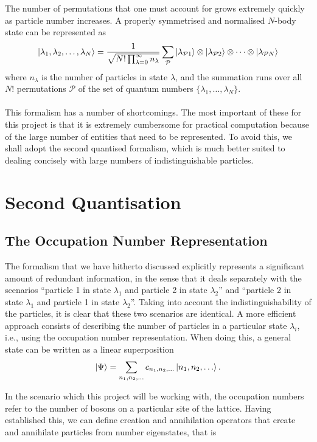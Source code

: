 \documentclass[a4paper,10pt]{article}
\begin{document}
The number of permutations that one must account for grows extremely quickly as particle number increases. A properly symmetrised and normalised $N$-body state can be
represented as \cite{Altland2010}
\begin{equation}
 \ket{\lambda_1,\lambda_2,\dots,\lambda_N}=\frac{1}{\sqrt{N!\prod_{\lambda=0}^{\infty}{n_{\lambda}}}}
 \sum_{\mathcal{P}}\ket{\lambda_{\mathcal{P}1}}\otimes \ket{\lambda_{\mathcal{P}2}}\otimes\dots\otimes\ket{\lambda_{\mathcal{P}N}}
\end{equation}
where $n_{\lambda}$ is the number of particles in state $\lambda$, and the summation runs over all $N!$ permutations $\mathcal{P}$ of the set of quantum numbers $\{ \lambda_1,\dots,\lambda_N\}$.
\\\\
This formalism has a number of shortcomings. The most important of these for this project is that it is extremely cumbersome for practical computation because of the large number of entities that need to be 
represented. To avoid this, we shall adopt the second quantised formalism, which is much better suited to dealing concisely with large numbers of indistinguishable particles.
\newpage
\section{Second Quantisation}
\subsection{The Occupation Number Representation}
The formalism that we have hitherto discussed explicitly represents a significant amount of redundant information, in the sense that it deals separately with the scenarios ``particle 1 in state $\lambda_1$ and 
particle 2 in state $\lambda_2$'' and ``particle 2 in state $\lambda_1$ and particle 1 in state $\lambda_2$''. Taking into account the indistinguishability of the particles, it is clear that these two scenarios
are identical. A more efficient approach consists of describing the number of particles in a particular state $\lambda_i$, i.e., using the occupation number representation. When doing this, a general 
state can be written as a linear superposition
\begin{equation}
 \ket{\Psi}=\sum_{n_1,n_2,\dots}c_{n_1,n_2,\dots}\ket{n_1,n_2,\dots}.
\end{equation}

In the scenario which this project will be working with, the occupation numbers refer to the number of bosons on a particular site of the lattice.
Having established this, we can define creation and annihilation operators that create and annihilate particles from number eigenstates, that is
\end{document}
